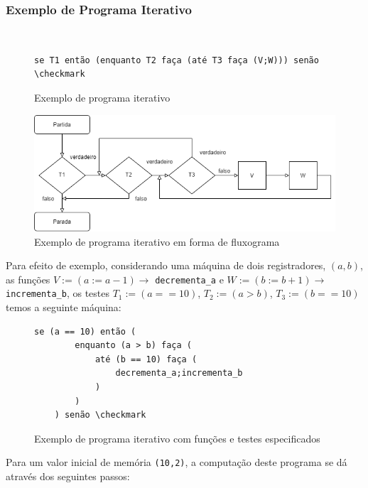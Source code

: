 \documentclass[12pt,fleqn]{article}
\begin{document}
\subsubsection{Exemplo de Programa Iterativo}
~ %

\begin{figure}[H]
\begin{Verbatim}[commandchars=\\\{\},codes={\catcode`\$=3\catcode`\^=7}]
    se T1 então (enquanto T2 faça (até T3 faça (V;W))) senão \checkmark
\end{Verbatim}
\caption{Exemplo de programa iterativo}
\end{figure}

\begin{figure}[H]
    \includegraphics[width=\linewidth]{img/iterativo_ex}
    \caption{Exemplo de programa iterativo em forma de fluxograma}
\end{figure}

Para efeito de exemplo, considerando uma máquina de dois registradores, $(a,b)$,
as funções $V := (a := a-1) \rightarrow$ \verb|decrementa_a| e $W := (b := b+1)
\rightarrow$ \verb|incrementa_b|, os testes $T_1 := (a == 10)$, $T_2 := (a >
b)$, $T_3 := (b == 10)$ temos a seguinte máquina:

\begin{figure}[H]
\begin{Verbatim}[commandchars=\\\{\},codes={\catcode`\$=3\catcode`\^=7}]
    se (a == 10) então (
        enquanto (a > b) faça (
            até (b == 10) faça (
                decrementa_a;incrementa_b
            )
        )
    ) senão \checkmark
\end{Verbatim}
\caption{Exemplo de programa iterativo com funções e testes especificados}
\end{figure}

\noindent
Para um valor inicial de memória \verb|(10,2)|, a computação deste programa se
dá através dos seguintes passos:
\end{document}
